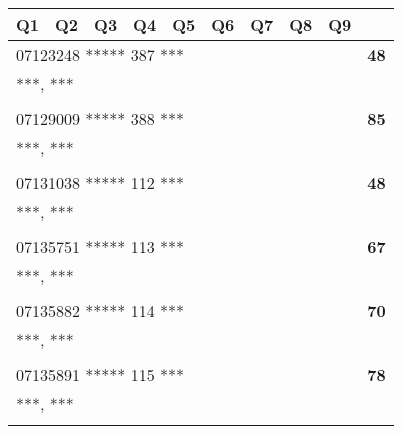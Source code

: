 \documentclass[a4paper,12pt]{article}
\begin{document}
\begin{tabular}{
   |p{9mm}|
    p{9mm}|
    p{9mm}|
    p{9mm}|
    p{9mm}|
    p{9mm}|
    p{9mm}|
    p{9mm}|
    p{9mm}|
    p{9mm}|}
\hline\hline
Q1 & Q2 & Q3 & Q4 & Q5 & Q6 & Q7 & Q8 & Q9 &     \\
\hline\hline
\multicolumn{9}{|l|}{07123248 ***** 387 ***} & \textbf{48} \\
\hline
\multicolumn{10}{|l|}{***, ***} \\
\hline
   \vrule height8mm width0pt depth2mm 
      &    &    &    &    &    &    &    &    &     \\
\hline\hline
\multicolumn{9}{|l|}{07129009 ***** 388 ***} & \textbf{85} \\
\hline
\multicolumn{10}{|l|}{***, ***} \\
\hline
   \vrule height8mm width0pt depth2mm 
      &    &    &    &    &    &    &    &    &     \\
\hline\hline
\multicolumn{9}{|l|}{07131038 ***** 112 ***} & \textbf{48} \\
\hline
\multicolumn{10}{|l|}{***, ***} \\
\hline
   \vrule height8mm width0pt depth2mm 
      &    &    &    &    &    &    &    &    &     \\
\hline\hline
\multicolumn{9}{|l|}{07135751 ***** 113 ***} & \textbf{67} \\
\hline
\multicolumn{10}{|l|}{***, ***} \\
\hline
   \vrule height8mm width0pt depth2mm 
      &    &    &    &    &    &    &    &    &     \\
\hline\hline
\multicolumn{9}{|l|}{07135882 ***** 114 ***} & \textbf{70} \\
\hline
\multicolumn{10}{|l|}{***, ***} \\
\hline
   \vrule height8mm width0pt depth2mm 
      &    &    &    &    &    &    &    &    &     \\
\hline\hline
\multicolumn{9}{|l|}{07135891 ***** 115 ***} & \textbf{78} \\
\hline
\multicolumn{10}{|l|}{***, ***} \\
\hline
   \vrule height8mm width0pt depth2mm 
      &    &    &    &    &    &    &    &    &     \\
\hline\hline
\end{tabular}
\end{document}
